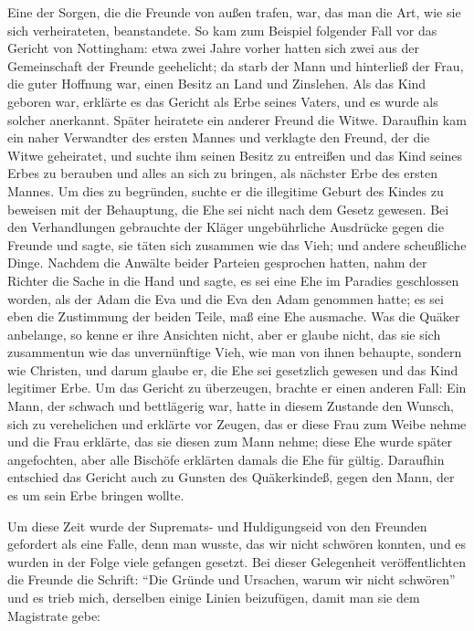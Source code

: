 Eine der Sorgen, die die Freunde von außen trafen, war,
das man die Art, wie sie sich verheirateten, beanstandete. So
kam zum Beispiel folgender Fall vor das Gericht von Nottingham: 
etwa zwei Jahre vorher hatten sich zwei aus der Gemeinschaft 
der Freunde geehelicht; da starb der Mann und hinterließ
der Frau, die guter Hoffnung war, einen Besitz an Land und Zinslehen. 
Als das Kind geboren war, erklärte es das Gericht als
Erbe seines Vaters, und es wurde als solcher anerkannt. Später
heiratete ein anderer Freund die Witwe. Daraufhin kam ein
naher Verwandter des ersten Mannes und verklagte den Freund,
der die Witwe geheiratet, und suchte ihm seinen Besitz zu entreißen
und das Kind seines Erbes zu berauben und alles an sich zu
bringen, als nächster Erbe des ersten Mannes. Um dies zu
begründen, suchte er die illegitime Geburt des Kindes zu beweisen
mit der Behauptung, die Ehe sei nicht nach dem Gesetz gewesen.
Bei den Verhandlungen gebrauchte der Kläger ungebührliche Ausdrücke 
gegen die Freunde und sagte, sie täten sich zusammen wie
das Vieh; und andere scheußliche Dinge. Nachdem die Anwälte
beider Parteien gesprochen hatten, nahm der Richter die Sache
in die Hand und sagte, es sei eine Ehe im Paradies geschlossen
worden, als der Adam die Eva und die Eva den Adam genommen
hatte; es sei eben die Zustimmung der beiden Teile, maß eine
Ehe ausmache. Was die Quäker anbelange, so kenne er ihre
Ansichten nicht, aber er glaube nicht, das sie sich zusammentun
wie das unvernünftige Vieh, wie man von ihnen behaupte, sondern
wie Christen, und darum glaube er, die Ehe sei gesetzlich gewesen
und das Kind legitimer Erbe. Um das Gericht zu überzeugen,
brachte er einen anderen Fall: Ein Mann, der schwach und 
bettlägerig war, hatte in diesem Zustande den Wunsch, sich zu 
verehelichen und erklärte vor Zeugen, das er diese Frau zum
Weibe nehme und die Frau erklärte, das sie diesen zum Mann
nehme; diese Ehe wurde später angefochten, aber alle Bischöfe
erklärten damals die Ehe für gültig. Daraufhin entschied das
Gericht auch zu Gunsten des Quäkerkindeß, gegen den Mann,
der es um sein Erbe bringen wollte.

Um diese Zeit wurde der Supremats- und Huldigungseid
von den Freunden gefordert als eine Falle, denn man wusste,
das wir nicht schwören konnten, und es wurden in der Folge
viele gefangen gesetzt. Bei dieser Gelegenheit veröffentlichten
die Freunde die Schrift: "`Die Gründe und Ursachen, warum wir
nicht schwören"' und es trieb mich, derselben einige Linien 
beizufügen, damit man sie dem Magistrate gebe:

